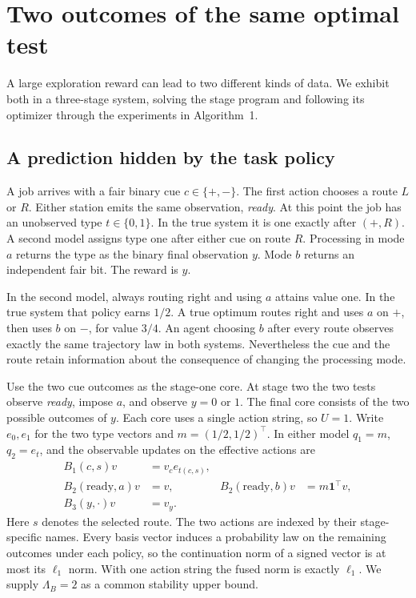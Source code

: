 \section{Two outcomes of the same optimal test}\label{sec:example}
A large exploration reward can lead to two different kinds of data. We exhibit both in a three-stage system, solving the stage program and following its optimizer through the experiments in Algorithm~1.

\subsection{A prediction hidden by the task policy}
A job arrives with a fair binary cue $c\in\{+,-\}$. The first action chooses a route $L$ or $R$. Either station emits the same observation, \emph{ready}. At this point the job has an unobserved type $t\in\{0,1\}$. In the true system it is one exactly after $(+,R)$. A second model assigns type one after either cue on route $R$. Processing in mode $a$ returns the type as the binary final observation $y$. Mode $b$ returns an independent fair bit. The reward is $y$.

In the second model, always routing right and using $a$ attains value one. In the true system that policy earns $1/2$. A true optimum routes right and uses $a$ on $+$, then uses $b$ on $-$, for value $3/4$. An agent choosing $b$ after every route observes exactly the same trajectory law in both systems. Nevertheless the cue and the route retain information about the consequence of changing the processing mode.

Use the two cue outcomes as the stage-one core. At stage two the two tests observe \emph{ready}, impose $a$, and observe $y=0$ or $1$. The final core consists of the two possible outcomes of $y$. Each core uses a single action string, so $U=1$. Write $e_0,e_1$ for the two type vectors and $m=(1/2,1/2)^\top$. In either model $q_1=m$, $q_2=e_t$, and the observable updates on the effective actions are
\begin{align*}
 B_1(c,s)v &= v_c e_{t(c,s)},\\
 B_2(\mathrm{ready},a)v &=v, &
 B_2(\mathrm{ready},b)v &=m\mathbf{1}^{\top}v,\\
 B_3(y,\cdot)v &= v_y .
\end{align*}
Here $s$ denotes the selected route. The two actions are indexed by their stage-specific names. Every basis vector induces a probability law on the remaining outcomes under each policy, so the continuation norm of a signed vector is at most its $\ell_1$ norm. With one action string the fused norm is exactly $\ell_1$. We supply $\Lambda_B=2$ as a common stability upper bound.

